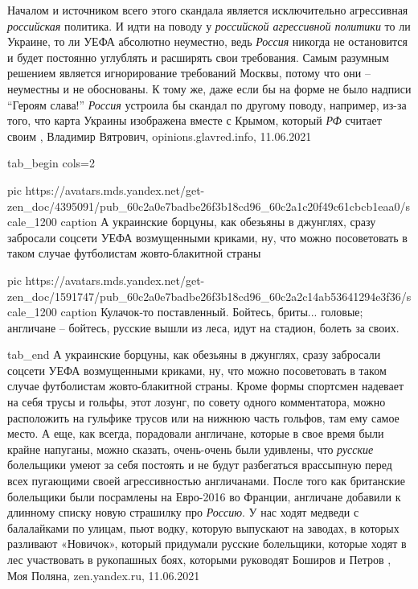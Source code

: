 Началом и источником всего этого скандала является исключительно агрессивная
\emph{российская} политика. И идти на поводу у \emph{российской агрессивной политики} то ли
Украине, то ли УЕФА абсолютно неуместно, ведь \emph{Россия} никогда не остановится и
будет постоянно углублять и расширять свои требования. Самым разумным решением
является игнорирование требований Москвы, потому что они – неуместны и не
обоснованы. К тому же, даже если бы на форме не было надписи \enquote{Героям слава!}
\emph{Россия} устроила бы скандал по другому поводу, например, из-за того, что карта
Украины изображена вместе с Крымом, который \emph{РФ} считает своим
, 
Владимир Вятрович, opinions.glavred.info, 11.06.2021

\ifcmt
tab_begin cols=2

  pic https://avatars.mds.yandex.net/get-zen_doc/4395091/pub_60c2a0e7badbe26f3b18cd96_60c2a1c20f49c61cbcb1eaa0/scale_1200
	caption А украинские борцуны, как обезьяны в джунглях, сразу забросали соцсети УЕФА возмущенными криками, ну, что можно посоветовать в таком случае футболистам жовто-блакитной страны

	pic https://avatars.mds.yandex.net/get-zen_doc/1591747/pub_60c2a0e7badbe26f3b18cd96_60c2a2c14ab53641294e3f36/scale_1200
	caption Кулачок-то поставленный. Бойтесь, бриты... головые; англичане – бойтесь, русские вышли из леса, идут на стадион, болеть за своих.

tab_end
\fi
А украинские борцуны, как обезьяны в джунглях, сразу забросали соцсети УЕФА
возмущенными криками, ну, что можно посоветовать в таком случае футболистам
жовто-блакитной страны. Кроме формы спортсмен надевает на себя трусы и гольфы,
этот лозунг, по совету одного комментатора, можно расположить на гульфике
трусов или на нижнюю часть гольфов, там ему самое место.  А еще, как всегда,
порадовали англичане, которые в свое время были крайне напуганы, можно сказать,
очень-очень были удивлены, что \emph{русские} болельщики умеют за себя постоять
и не будут разбегаться врассыпную перед всех пугающими своей агрессивностью
англичанами. После того как британские болельщики были посрамлены на Евро-2016
во Франции, англичане добавили к длинному списку новую страшилку про
\emph{Россию}.  У нас ходят медведи с балалайками по улицам, пьют водку,
которую выпускают на заводах, в которых разливают «Новичок», который придумали
русские болельщики, которые ходят в лес участвовать в рукопашных боях, которыми
руководят Боширов и Петров
, 
Моя Поляна, zen.yandex.ru, 11.06.2021

